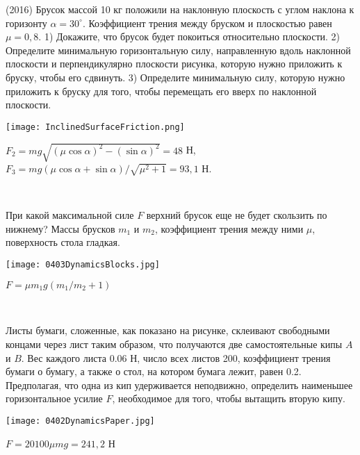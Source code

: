 \begin{ex}
(2016) Брусок массой 10 кг положили на наклонную плоскость с углом наклона к горизонту $\alpha = 30^{\circ}$. Коэффициент трения между бруском и плоскостью равен $\mu = 0,8$. 1) Докажите, что брусок будет покоиться относительно плоскости. 2) Определите минимальную горизонтальную силу, направленную вдоль наклонной плоскости и перпендикулярно плоскости рисунка, которую нужно приложить к бруску, чтобы его сдвинуть. 3) Определите минимальную силу‚ которую нужно приложить к бруску для того, чтобы перемещать его вверх по наклонной плоскости.
\begin{center}
\texttt{[image: InclinedSurfaceFriction.png]}
\end{center}
\begin{ans}
$F_2 = mg \sqrt{(\mu \cos \alpha)^2 - (\sin \alpha)^2} = 48$ Н, $F_3 = mg(\mu \cos \alpha + \sin \alpha)/\sqrt{\mu^2 + 1} = 93,1$ Н. 
\end{ans}
\end{ex}

\begin{ex}
\hspace{0pt} \\
\begin{minipage}{.65\textwidth}
При какой максимальной силе $F$ верхний брусок еще не будет скользить по нижнему? Массы брусков $m_1$ и $m_2$, коэффициент трения между ними $\mu$, поверхность стола гладкая.
\end{minipage}
\begin{minipage}{.35\textwidth}
\centering
\texttt{[image: 0403DynamicsBlocks.jpg]}
\end{minipage}
\begin{ans}
$F = \mu m_1 g \left(m_1/m_2 + 1 \right)$
\end{ans}
\end{ex}

\begin{ex}
\hspace{0pt} \\
\begin{minipage}{.65\textwidth}
Листы бумаги, сложенные, как показано на рисунке, склеивают свободными концами через лист таким образом, что получаются две самостоятельные кипы $A$ и $B$. Вес каждого листа 0.06 Н, число всех листов 200, коэффициент трения бумаги о бумагу, а также о стол, на котором бумага лежит, равен 0.2. Предполагая, что одна из кип удерживается неподвижно, определить наименьшее горизонтальное усилие $F$, необходимое для того, чтобы вытащить вторую кипу.
\end{minipage}
\begin{minipage}{.35\textwidth}
\centering
\texttt{[image: 0402DynamicsPaper.jpg]}
\end{minipage}
\begin{ans}
$F = 20100 \mu mg = 241,2$ Н
\end{ans}
\end{ex}

